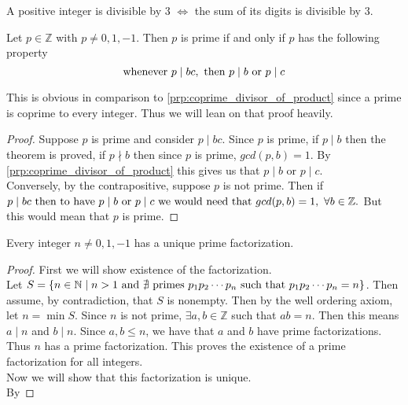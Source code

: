 \documentclass[../main.tex]{subfiles}
\begin{document}
\begin{exercise}
A positive integer is divisible by $3$ $\iff$ the sum of its digits is divisible by $3$.
\end{exercise}

\begin{theorem}\label{thm:prime_dividing_product}
Let \(p \in \mathbb{Z}\) with \(p \neq 0,1, -1.\) Then \(p\) is prime if and only if \(p\) has the following property
\[
\textnormal{whenever } p \mid bc, \textnormal{ then } p \mid b \textnormal{ or } p \mid c
\]
\end{theorem}

\begin{remark}
This is obvious in comparison to \ref{prp:coprime_divisor_of_product} since a prime is coprime to every integer. Thus we will lean on that proof heavily.
\end{remark}

\begin{proof}
Suppose \(p\) is prime and consider \(p \mid bc\). Since \(p\) is prime, if \(p \mid b\) then the theorem is proved, if \(p \nmid b\) then since \(p\) is prime, \(gcd(p,b) = 1\). By \ref{prp:coprime_divisor_of_product} this gives us that \(p \mid b\) or \(p \mid c\). \\
Conversely, by the contrapositive, suppose \(p\) is not prime. Then if \(p \mid bc \textnormal{ then to have } p \mid b \textnormal{ or } p \mid c \textnormal{ we would need that } gcd(p,b) = 1, \ \forall b \in \mathbb{Z}.\) But this would mean that \(p\) is prime.

\end{proof}


\begin{theorem}\label{thm:fund_thm_of_arith}
Every integer \(n \neq 0, 1, -1\) has a unique prime factorization.
\end{theorem}

\begin{proof}
First we will show existence of the factorization.\\
Let \( S = \{ n \in \mathbb{N} \mid n > 1 \textnormal{ and } \nexists \textnormal{ primes } p_1p_2 \cdots p_n \textnormal{ such that } p_1p_2 \cdots p_n = n \}\). Then assume, by contradiction, that \(S\) is nonempty. Then by the well ordering axiom, let \(n = \min S\). Since \(n\) is not prime, \(\exists a, b \in \mathbb{Z}\) such that \(ab = n\). Then this means \(a \mid n\) and \(b \mid n \). Since \(a,b \leq n\), we have that \(a\) and \(b\) have prime factorizations. Thus \(n\) has a prime factorization. This proves the existence of a prime factorization for all integers.\\
Now we will show that this factorization is unique.\\
By
\end{proof}
\end{document}
